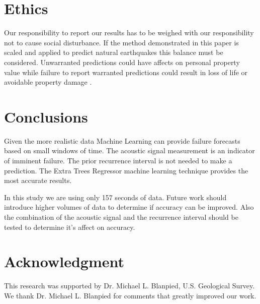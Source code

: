 \documentclass[]{llncs} %
\begin{document}
\section{Ethics}

Our responsibility to report our results has to be weighed with our responsibility not to cause social disturbance. If the method demonstrated in this paper is scaled and applied to predict natural earthquakes this balance must be considered. Unwarranted predictions could have affects on personal property value while failure to report warranted predictions could result in loss of life or avoidable property damage \cite{Ayhan}. \par

\section{Conclusions}

Given the more realistic data Machine Learning can provide failure forecasts based on small windows of time. The acoustic signal measurement is an indicator of imminent failure. The prior recurrence interval is not needed to make a prediction. The Extra Trees Regressor machine learning technique provides the most accurate results.



%
In this study we are using only 157 seconds of data. Future work should introduce higher volumes of data to determine if accuracy can be improved. Also the combination of the acoustic signal and the recurrence interval should be tested to determine it's affect on accuracy.
\par

\section{Acknowledgment}
This research was supported by Dr. Michael L. Blanpied,  U.S. Geological Survey. We thank Dr. Michael L. Blanpied for comments that greatly improved our work.



\end{document}

